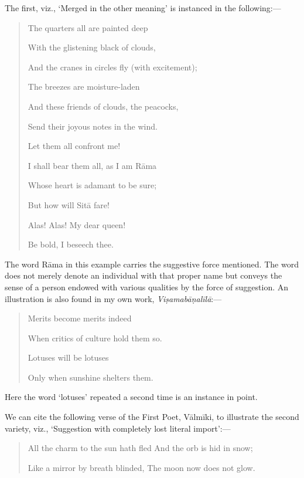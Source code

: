 \documentclass[12pt]{book}
\begin{document}
The first, viz., `Merged in the other meaning' is instanced in
the following:---

\begin{quotation}
\begin{em}
The quarters all are painted deep

With the glistening black of clouds,

And the cranes in circles fly (with excitement);

The breezes are moisture-laden

And these friends of clouds, the peacocks,

Send their joyous notes in the wind.

Let them all confront me!

I shall bear them all, as I am Rāma

Whose heart is adamant to be sure;

But how will Sitā fare!

Alas! Alas! My dear queen!

Be bold, I beseech thee.
\end{em}
\end{quotation}

The word Rāma in this example carries the suggestive force
mentioned. The word does not merely denote an individual with
that proper name but conveys the sense of a person endowed with
various qualities by the force of suggestion. An illustration is
also found in my own work, \textit{Viṣamabāṇalīlā}:---

\begin{quotation}
\begin{em}
Merits become merits indeed

When critics of culture hold them so.

Lotuses will be lotuses

Only when sunshine shelters them.
\end{em}
\end{quotation}

Here the word `lotuses' repeated a second time is an instance
in point.

We can cite the following verse of the First Poet, Vālmīki,
to illustrate the second variety, viz., `Suggestion with completely
lost literal import':---

\begin{quotation}
\begin{em}
All the charm to the sun hath fled
And the orb is hid in snow;

Like a mirror by breath blinded,
The moon now does not glow.
\end{em}
\end{quotation}
\end{document}

